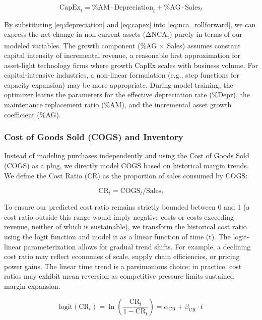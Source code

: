 \documentclass[12pt,a4paper]{article}
\begin{document}
\begin{equation}\label{eq:capex}
\text{CapEx}_t = \text{\%AM} \cdot \text{Depreciation}_t + \text{\%AG} \cdot \text{Sales}_t
\end{equation}

By substituting \eqref{eq:depreciation} and \eqref{eq:capex} into \eqref{eq:nca_rollforward}, we can express
the net change in non-current assets (ΔNCA\textsubscript{t}) purely in
terms of our modeled variables. The growth component (\%AG $\times$ Sales) assumes constant capital intensity of incremental revenue, a reasonable first approximation for asset-light technology firms where growth CapEx scales with business volume. For capital-intensive industries, a non-linear formulation (e.g., step functions for capacity expansion) may be more appropriate. During model training, the optimizer
learns the parameters for the effective depreciation rate (\%Depr), the
maintenance replacement ratio (\%AM), and the incremental asset growth
coefficient (\%AG).

\subsubsection{Cost of Goods Sold (COGS) and Inventory}

Instead of modeling purchases independently and using the Cost of Goods
Sold (COGS) as a plug, we directly model COGS based on historical margin
trends. We define the Cost Ratio (CR) as the proportion of sales
consumed by COGS:

\begin{equation}\label{eq:cost_ratio}
\text{CR}_t = \text{COGS}_t / \text{Sales}_t
\end{equation}

To ensure our predicted cost ratio remains strictly bounded between 0
and 1 (a cost ratio outside this range would imply negative costs or costs exceeding revenue, neither of which is sustainable), we transform the historical cost ratio using the logit function
and model it as a linear function of time (t). The logit-linear parameterization allows for gradual trend shifts. For example, a declining cost ratio may reflect economies of scale, supply chain efficiencies, or pricing power gains. The linear time trend is a parsimonious choice; in practice, cost ratios may exhibit mean reversion as competitive pressure limits sustained margin expansion.

\begin{equation}\label{eq:cost_ratio_logit}
\text{logit}(\text{CR}_t) = \ln \left( \frac{\text{CR}_t}{1 - \text{CR}_t} \right) = \alpha_{\text{CR}} + \beta_{\text{CR}} \cdot t
\end{equation}
\end{document}
